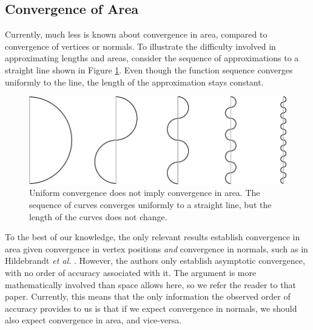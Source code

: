 \subsection{Convergence of Area}
\label{chap1:sec:areaconvergence}

Currently, much less is known about convergence in area, compared to
convergence of vertices or normals. To illustrate the difficulty
involved in approximating lengths and areas, consider the sequence
of approximations to a straight line shown in Figure \ref{fig:uniformconvergence}. 
Even though the function sequence converges uniformly to the line, 
the length of the approximation stays constant.

\begin{figure}[b]
\centering
\includegraphics[width=.8\linewidth]{chapter2/figures/sequence.pdf}
\caption{Uniform convergence does not imply convergence in area. The
  sequence of curves converges uniformly to a straight line, but the
  length of the curves does not change.}
\label{fig:uniformconvergence}
\end{figure}


To the best of our knowledge, the only relevant results establish
convergence in area given convergence in vertex positions \emph{and}
convergence in normals, such as in Hildebrandt {\em et al.}
\cite{hildebrandt06}. However, the authors only establish
asymptotic convergence, with no order of accuracy associated with
it. The argument is more mathematically involved than space allows
here, so we refer the reader to that paper. Currently, this means that
the only information the observed order of accuracy provides to us is that
if we expect convergence in normals, we should also expect convergence
in area, and vice-versa.


